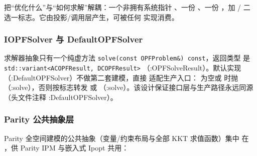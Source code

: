 
 把“优化什么”与“如何求解”解耦：一个非拥有系统指针
、一份 、一份 ，加
/ 二选一标志。它由投影/调用层产生，可被任何
 实现消费。

\subsubsection*{IOPFSolver 与 DefaultOPFSolver}


求解器抽象只有一个纯虚方法
\texttt{solve(const OPFProblem\&) const}，返回类型
 是 \texttt{std::variant<ACOPFResult, DCOPFResult>}
（:OPFSolveResult）。默认实现 （:DefaultOPFSolver）不做第二套建模，直接
适配生产入口： 为空或  时抛
（:solve），否则按标志转发
 或 
（:solve）。该设计保证接口层与生产路径永远同源（头文件注释 :DefaultOPFSolver）。

\subsubsection*{Parity 公共抽象层}

Parity 全空间建模的公共抽象（变量/约束布局与全部 KKT 求值函数）集中
在 ，供
Parity IPM 与嵌入式 Ipopt 共用：

